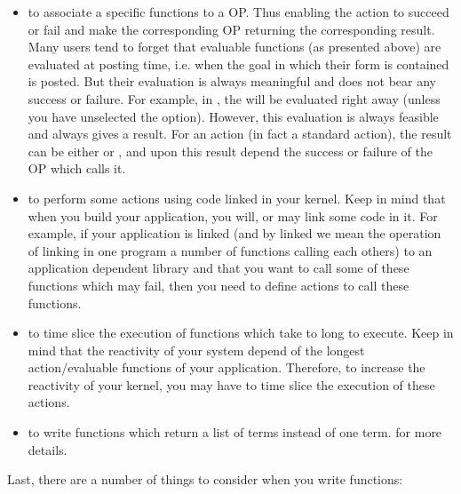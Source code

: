 \begin{itemize}

\item to associate a specific functions to a OP. Thus enabling the action to
succeed or fail and make the corresponding OP returning the corresponding
result. Many users tend to forget that evaluable functions (as presented
above) are evaluated at posting time, i.e. when the goal in which their
form is contained is posted. But their evaluation is always meaningful and
does not bear any success or failure. For example, in , the    will be evaluated right away (unless you have
unselected the  option). However, this evaluation is
always feasible and always gives a result. For an action (in fact a
standard action), the result can  be either  or , and
upon this result depend the success or failure of the OP which calls it.

\item to perform some actions using code linked in your kernel. Keep in
mind that when you build your application, you will, or may link some
code in it. For example, if your application is linked (and by linked we
mean the operation of linking in one program a number of functions calling
each others) to an application dependent library and that you want to
call some of these functions which may fail, then you need to define
actions to call these functions.

\item to time slice the execution of functions which take to long to
execute. Keep in mind that the reactivity of your system depend of the
longest action/evaluable functions of your application. Therefore, to
increase the reactivity of your kernel, you may have to time slice the
execution of these actions.

\item to write functions which return a list of terms instead of one
term.  for more details.

\end{itemize}

Last, there are a number of things to consider when you write functions:

